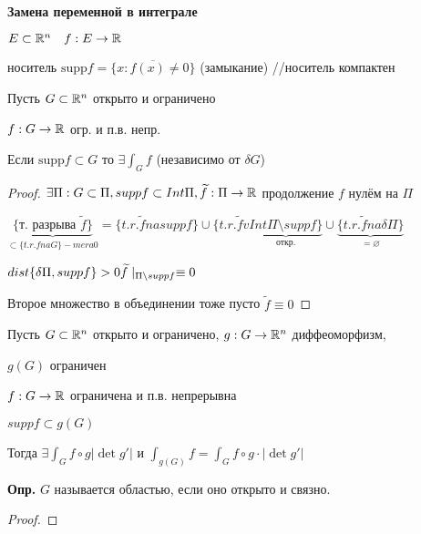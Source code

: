     \textbf{Замена переменной в интеграле}
    
    $E \subset \mathbb{R}^n \quad f: E \to \mathbb{R}$
        
    носитель $\text{supp} f = \overline{\{ x: f(x) \neq 0\}}$ (замыкание)
    \small{//носитель компактен}

    \begin{remark}
        Пусть $G \subset \mathbb{R}^n$ открыто и ограничено

        $f: G \to \mathbb{R}$ огр. и п.в. непр.

        Если $\text{supp} f \subset G$ то $\exists \int_G f$ 
        (независимо от $\delta G$)
    \end{remark}
    \begin{proof}
        $\exists \Pi: G \subset \Pi, supp f \subset Int \Pi, \widetilde{f}: \Pi \to \mathbb{R}$
        продолжение $f$ нулём на $\Pi$

        $\underbrace{\{ \text{т. разрыва } \widetilde{f}\}}_{\subset \{ t.r. f na G\} - mera 0} = \{ t.r. \widetilde{f} na supp f\}
        \cup \{ t.r. \widetilde{f} v \underbrace{Int \Pi\setminus supp f\}}_{\text{откр.}} \cup 
        \underbrace{\{ t.r. \widetilde{f} na \delta\Pi\}}_{= \varnothing}
        $

        $dist\{ \delta \Pi, supp f\} > 0 \\
        \widetilde{f} \mid_{\Pi \setminus supp f} \equiv 0
        $

        Второе множество в объединении тоже пусто $\widetilde{f} \equiv 0$
    \end{proof}

    \begin{theorem}
        Пусть $G\subset \mathbb{R}^n $ открыто и ограничено, $g: G\to\mathbb{R}^n$ диффеоморфизм,

        $g(G)$ ограничен

        $f: G \to \mathbb{R}$ ограничена и п.в. непрерывна

        $supp f \subset g(G)$

        Тогда $\exists \int_G f \circ g | \det g' |$ и $\int_{g(G)} f = 
        \int_G f\circ g \cdot |\det g'|$
    \end{theorem}
    \textbf{Опр.}
    $G$ называется областью, если оно открыто и связно.
    
    \begin{proof}
        
    \end{proof}
    
 